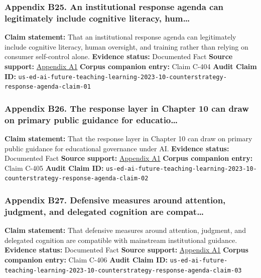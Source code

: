 \documentclass[
  american,
  11pt,
  letterpaper,
]{article}
\begin{document}
\subsubsection{Appendix B25. An institutional response agenda can
legitimately include cognitive literacy,
hum\ldots{}}\label{ch-10-appendix-b25-an-institutional-response-agenda-can-legitimately-include-cognitive-literacy-hum}

\textbf{Claim statement:} That an institutional response agenda can
legitimately include cognitive literacy, human oversight, and training
rather than relying on consumer self-control alone. \textbf{Evidence
status:} Documented Fact \textbf{Source support:}
\hyperref[ch-10-appendix-a1-artificial-intelligence-and-the-future-of-teaching-and-learning-insights-and-recommendations]{Appendix
A1} \textbf{Corpus companion entry:} Claim C-404 \textbf{Audit Claim
ID:}
\texttt{us-ed-ai-future-teaching-learning-2023-10-counterstrategy-response-agenda-claim-01}

\subsubsection{Appendix B26. The response layer in Chapter 10 can draw
on primary public guidance for
educatio\ldots{}}\label{ch-10-appendix-b26-the-response-layer-in-chapter-10-can-draw-on-primary-public-guidance-for-educatio}

\textbf{Claim statement:} That the response layer in Chapter 10 can draw
on primary public guidance for educational governance under AI.
\textbf{Evidence status:} Documented Fact \textbf{Source support:}
\hyperref[ch-10-appendix-a1-artificial-intelligence-and-the-future-of-teaching-and-learning-insights-and-recommendations]{Appendix
A1} \textbf{Corpus companion entry:} Claim C-405 \textbf{Audit Claim
ID:}
\texttt{us-ed-ai-future-teaching-learning-2023-10-counterstrategy-response-agenda-claim-02}

\subsubsection{Appendix B27. Defensive measures around attention,
judgment, and delegated cognition are
compat\ldots{}}\label{ch-10-appendix-b27-defensive-measures-around-attention-judgment-and-delegated-cognition-are-compat}

\textbf{Claim statement:} That defensive measures around attention,
judgment, and delegated cognition are compatible with mainstream
institutional guidance. \textbf{Evidence status:} Documented Fact
\textbf{Source support:}
\hyperref[ch-10-appendix-a1-artificial-intelligence-and-the-future-of-teaching-and-learning-insights-and-recommendations]{Appendix
A1} \textbf{Corpus companion entry:} Claim C-406 \textbf{Audit Claim
ID:}
\texttt{us-ed-ai-future-teaching-learning-2023-10-counterstrategy-response-agenda-claim-03}
\end{document}
